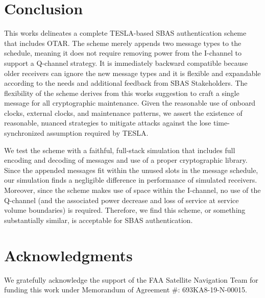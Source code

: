 \documentclass[APA,STIX1COL]{IONjournal/ION-APA Template}
\begin{document}
\section{Conclusion} \label{sec:conclusion}

	This works delineates a complete TESLA-based SBAS authentication scheme that includes OTAR.
	The scheme merely appends two message types to the schedule, meaning it does not require removing power from the I-channel to support a Q-channel strategy.
	It is immediately backward compatible because older receivers can ignore the new message types and it is flexible and expandable according to the needs and additional feedback from SBAS Stakeholders.
	The flexibility of the scheme derives from this works suggestion to craft a single message for all cryptographic maintenance.
	Given the reasonable use of onboard clocks, external clocks, and maintenance patterns, we assert the existence of reasonable, nuanced strategies to mitigate attacks against the lose time-synchronized assumption required by TESLA.

	We test the scheme with a faithful, full-stack simulation that includes full encoding and decoding of messages and use of a proper cryptographic library.
	Since the appended messages fit within the unused slots in the message schedule, our simulation finds a negligible difference in performance of simulated receivers.
	Moreover, since the scheme makes use of space within the I-channel, no use of the Q-channel (and the associated power decrease and loss of service at service volume boundaries) is required.
	Therefore, we find this scheme, or something substantially similar, is acceptable for SBAS authentication.

\section*{Acknowledgments}

We gratefully acknowledge the support of the FAA Satellite Navigation Team for funding this work under Memorandum of Agreement \#: 693KA8-19-N-00015.


\end{document}
